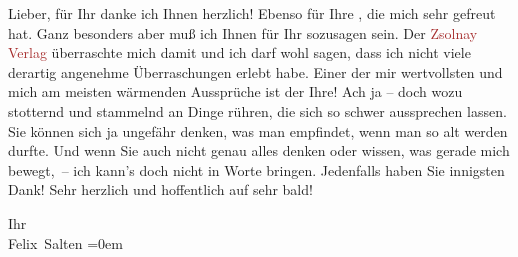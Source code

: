 \pstart
           Lieber, für Ihr \label{K_L03587-1v}\label{K_L03587-1h} danke ich Ihnen herzlich! Ebenso für Ihre \label{K_L03587-2v}\label{K_L03587-2h}, die mich sehr gefreut hat.
               Ganz besonders aber muß ich Ihnen für Ihr sozusagen \label{K_L03587-3v}\label{K_L03587-3h} sein. Der \textcolor{brown}{Zsolnay Verlag}{}\ledrightnote{\textcolor{brown}{Paul Zsolnay Verlag}} überraschte mich
               damit und ich darf wohl sagen, dass ich nicht viele derartig angenehme Überraschungen
               erlebt habe. Einer der mir wertvollsten und mich am meisten wärmenden Aussprüche ist
               der Ihre! Ach ja – doch wozu stotternd und stammelnd an Dinge rühren, die sich so
               schwer aussprechen lassen. Sie können sich ja ungefähr denken, was man empfindet,
               wenn man so alt werden durfte. Und wenn Sie auch nicht genau alles denken oder
               wissen, was gerade mich bewegt, – ich kann’s doch nicht in Worte bringen. Jedenfalls
               haben Sie innigsten Dank! Sehr herzlich und hoffentlich auf sehr bald!\pend
           
\pstart
           Ihr {\\[\baselineskip]}\spacefill\mbox{Felix Salten}\pend
           \leftskip=0em{}\endnumbering{}  
      